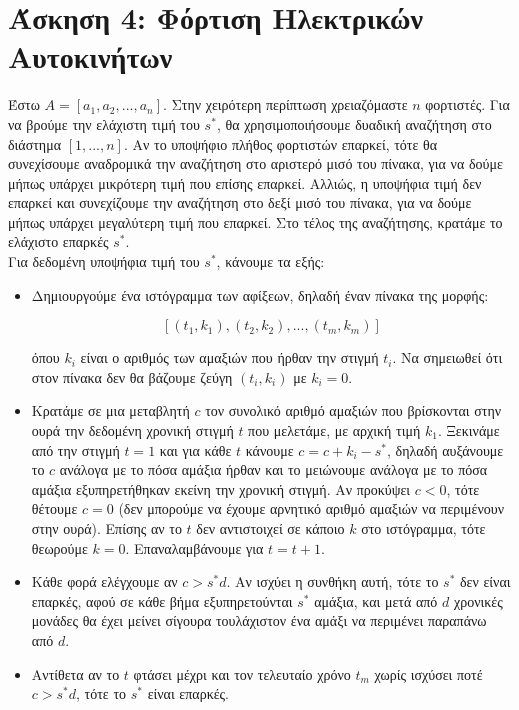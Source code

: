 	\section*{Άσκηση 4: Φόρτιση Ηλεκτρικών Αυτοκινήτων}
		Έστω $A = [a_1, a_2, ..., a_n]$. Στην χειρότερη περίπτωση χρειαζόμαστε $n$ φορτιστές. Για να βρούμε την ελάχιστη τιμή του $s^*$, θα χρησιμοποιήσουμε δυαδική αναζήτηση στο διάστημα $[1,...,n]$. Αν το υποψήφιο πλήθος φορτιστών επαρκεί, τότε θα συνεχίσουμε αναδρομικά την αναζήτηση στο αριστερό μισό του πίνακα, για να δούμε μήπως υπάρχει μικρότερη τιμή που επίσης επαρκεί. Αλλιώς, η υποψήφια τιμή δεν επαρκεί και συνεχίζουμε την αναζήτηση στο δεξί μισό του πίνακα, για να δούμε μήπως υπάρχει μεγαλύτερη τιμή που επαρκεί. Στο τέλος της αναζήτησης, κρατάμε το ελάχιστο επαρκές $s^*$.\\
		
		Για δεδομένη υποψήφια τιμή του $s^*$, κάνουμε τα εξής: \\
		
		\begin{itemize}
			\item Δημιουργούμε ένα ιστόγραμμα των αφίξεων, δηλαδή έναν πίνακα της μορφής: 
			
			\[
				[(t_1, k_1), (t_2, k_2),...,(t_m, k_m)]
			\]
			
			όπου $k_i$ είναι ο αριθμός των αμαξιών που ήρθαν την στιγμή $t_i$. Να σημειωθεί ότι στον πίνακα δεν θα βάζουμε ζεύγη $(t_i, k_i)$ με $k_i = 0$. 
			\item Κρατάμε σε μια μεταβλητή $c$ τον συνολικό αριθμό αμαξιών που βρίσκονται στην ουρά την δεδομένη χρονική στιγμή $t$ που μελετάμε, με αρχική τιμή $k_1$. Ξεκινάμε από την στιγμή $t=1$ και για κάθε $t$ κάνουμε $c = c + k_i - s^*$, δηλαδή αυξάνουμε το $c$ ανάλογα με το πόσα αμάξια ήρθαν και το μειώνουμε ανάλογα με το πόσα αμάξια εξυπηρετήθηκαν εκείνη την χρονική στιγμή. Αν προκύψει $c < 0$, τότε θέτουμε $c = 0$ (δεν μπορούμε να έχουμε αρνητικό αριθμό αμαξιών να περιμένουν στην ουρά). Επίσης αν το $t$ δεν αντιστοιχεί σε κάποιο $k$ στο ιστόγραμμα, τότε θεωρούμε $k = 0$. Επαναλαμβάνουμε για $t = t + 1$.
			\item Κάθε φορά ελέγχουμε αν $c > s^*d$. Αν ισχύει η συνθήκη αυτή, τότε το $s^*$ δεν είναι επαρκές, αφού σε κάθε βήμα εξυπηρετούνται $s^*$ αμάξια, και μετά από $d$ χρονικές μονάδες θα έχει μείνει σίγουρα τουλάχιστον ένα αμάξι να περιμένει παραπάνω από $d$. 
			\item Αντίθετα αν το $t$ φτάσει μέχρι και τον τελευταίο χρόνο $t_m$ χωρίς ισχύσει ποτέ $c > s^*d$, τότε το $s^*$ είναι επαρκές.
		\end{itemize}
	
